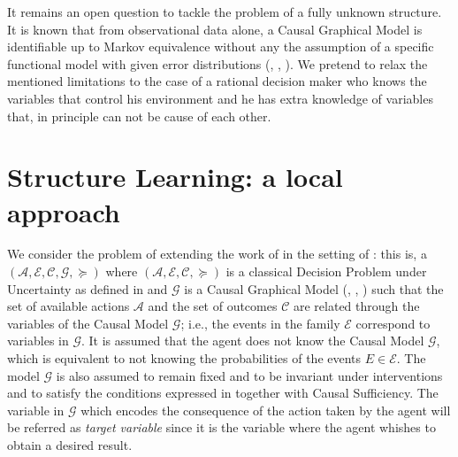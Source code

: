 \documentclass[letterpaper]{article}
\begin{document}
It remains an open question to tackle the problem of a fully unknown structure. It is known that from observational data alone, a Causal Graphical Model is identifiable up to Markov equivalence without any the assumption of a specific functional model with given error distributions (\cite{hauser2012characterization}, \cite{hauser2012two}, \cite{peters2011identifiability}). We pretend to relax the mentioned limitations to the case of a rational decision maker who knows the variables that control his environment and he has extra knowledge of variables that, in principle can not be cause of each other. 

\section{Structure Learning: a local approach}
We consider the problem of extending the work of \cite{gonzalez2018playing} in the setting of \cite{2019arXiv190202279G}: this is, a $(\mathcal{A}, \mathcal{E}, \mathcal{C}, \mathcal{G}, \succeq)$ where $(\mathcal{A}, \mathcal{E}, \mathcal{C}, \succeq)$ is a classical Decision Problem under Uncertainty as defined in \cite{bernardo2000bayesian} and $\mathcal{G}$ is a Causal Graphical Model (\cite{spirtes2000causation}, \cite{koller2009probabilistic}, \cite{sucar2015probabilistic}) such that the set of available actions $\mathcal{A}$ and the set of outcomes $\mathcal{C}$ are related through the variables of the Causal Model $\mathcal{G}$; i.e., the events in the family $\mathcal{E}$ correspond to variables in $\mathcal{G}$. It is assumed that the agent does not know the Causal Model $\mathcal{G}$, which is equivalent to not knowing the probabilities of the events $E \in \mathcal{E}$. The model $\mathcal{G}$ is also assumed to remain fixed and to be invariant under interventions \cite{woodward2005making} and to satisfy the conditions expressed in \cite{spirtes2000causation} together with Causal Sufficiency. The variable in $\mathcal{G}$ which encodes the consequence of the action taken by the agent will be referred as \textit{target variable} since it is the variable where the agent whishes to obtain a desired result. 
\end{document}
